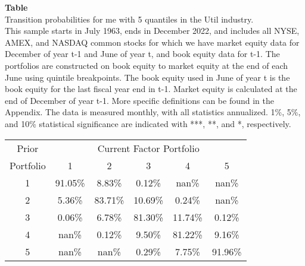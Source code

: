 \begin{table*}[ht!]
\raggedright
{}
\label{tab: transition_probs_me_Util_with_5_quantiles}
\textbf{Table \thetable} \\
Transition probabilities for me with 5 quantiles in the Util industry. \\
\hspace*{1em}This sample starts in July 1963, ends in December 2022, and includes all NYSE, AMEX, and NASDAQ common stocks for which we have market equity data for December of year t-1 and June of year t, and book equity data for t-1. The portfolios are constructed on book equity to market equity at the end of each June using quintile breakpoints.  The book equity used in June of year t is the book equity for the last fiscal year end in t-1.  Market equity is calculated at the end of December of year t-1.  More specific definitions can be found in the Appendix.  The data is measured monthly, with all statistics annualized.  1\%, 5\%, and 10\% statistical significance are indicated with ***, **, and *, respectively. \\
\vspace{0.5em}
\centering
\begin{adjustbox}{max width=\textwidth}
\begin{tabular}{@{}cccccc@{}}
\toprule
Prior & \multicolumn{5}{c}{Current Factor Portfolio} \\
Portfolio & 1 & 2 & 3 & 4 & 5 \\
\midrule
1 & 91.05\% & 8.83\% & 0.12\% & nan\% & nan\% \\
2 & 5.36\% & 83.71\% & 10.69\% & 0.24\% & nan\% \\
3 & 0.06\% & 6.78\% & 81.30\% & 11.74\% & 0.12\% \\
4 & nan\% & 0.12\% & 9.50\% & 81.22\% & 9.16\% \\
5 & nan\% & nan\% & 0.29\% & 7.75\% & 91.96\% \\
\bottomrule
\end{tabular}
\end{adjustbox}
\end{table*}